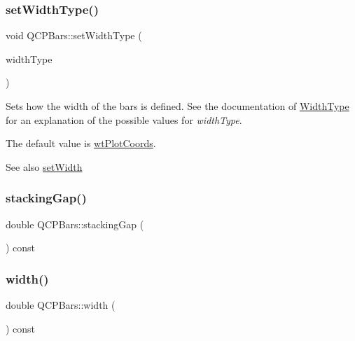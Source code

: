 \subsubsection{\texorpdfstring{setWidthType()}{setWidthType()}}
{\footnotesize\ttfamily void Q\+C\+P\+Bars\+::set\+Width\+Type (\begin{DoxyParamCaption}\item[{\mbox{\hyperlink{class_q_c_p_bars_a65dbbf1ab41cbe993d71521096ed4649}{Q\+C\+P\+Bars\+::\+Width\+Type}}}]{width\+Type }\end{DoxyParamCaption})}

Sets how the width of the bars is defined. See the documentation of \mbox{\hyperlink{class_q_c_p_bars_a65dbbf1ab41cbe993d71521096ed4649}{Width\+Type}} for an explanation of the possible values for {\itshape width\+Type}.

The default value is \mbox{\hyperlink{class_q_c_p_bars_a65dbbf1ab41cbe993d71521096ed4649aad3cc60ae1bfb1160a30237bee9eaf10}{wt\+Plot\+Coords}}.

\begin{DoxySeeAlso}{See also}
\mbox{\hyperlink{class_q_c_p_bars_afec6116579d44d5b706e0fa5e5332507}{set\+Width}} 
\end{DoxySeeAlso}
\mbox{\label{class_q_c_p_bars_a2e6192fa9c16df7ba94cd50c0c9ec7ce}} 
\subsubsection{\texorpdfstring{stackingGap()}{stackingGap()}}
{\footnotesize\ttfamily double Q\+C\+P\+Bars\+::stacking\+Gap (\begin{DoxyParamCaption}{ }\end{DoxyParamCaption}) const\hspace{0.3cm}{\ttfamily [inline]}}

\mbox{\label{class_q_c_p_bars_abe7eb3987d8711f45829db879aee2280}} 
\subsubsection{\texorpdfstring{width()}{width()}}
{\footnotesize\ttfamily double Q\+C\+P\+Bars\+::width (\begin{DoxyParamCaption}{ }\end{DoxyParamCaption}) const\hspace{0.3cm}{\ttfamily [inline]}}

